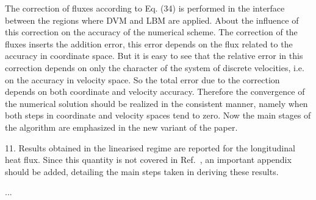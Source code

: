 \documentclass{article}
\begin{document}
The correction of fluxes according to Eq. (34) is performed in the interface
between the regions where DVM and LBM are applied.
About the influence of this correction on the accuracy of the numerical scheme.
The correction of the fluxes inserts the addition error,
this error depends on the flux related to the accuracy in coordinate space.
But it is easy to see that the relative error in this correction
depends on only the character of the system of discrete velocities,
i.e. on the accuracy in velocity space.
So the total error due to the correction depends on both coordinate and velocity accuracy.
Therefore the convergence of the numerical solution should be realized in the consistent manner,
namely when both steps in coordinate and velocity spaces tend to zero.
Now the main stages of the algorithm are emphasized in the new variant of the paper.

\begin{leftbar}
\end{leftbar}

\begin{quoting}
    11. Results obtained in the linearised regime are
    reported for the longitudinal heat flux. Since this
    quantity is not covered in Ref.~\cite{Luo2016}, an important
    appendix should be added, detailing the main steps
    taken in deriving these results.
\end{quoting}

...

\begin{leftbar}
\end{leftbar}

\printbibliography
\end{document}

